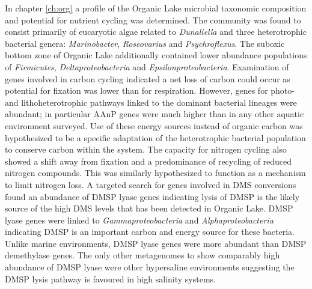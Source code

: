 In chapter \ref{ch:org} a profile of the Organic Lake microbial taxonomic composition and potential for nutrient cycling was determined.
The community was found to consist primarily of eucaryotic algae related to \emph{Dunaliella} and three heterotrophic bacterial genera: \emph{Marinobacter}, \emph{Roseovarius} and \emph{Psychroflexus}.
The suboxic bottom zone of Organic Lake additionally contained lower abundance populations of \emph{Firmicutes}, \emph{Deltaproteobacteria} and \emph{Epsilonproteobacteria}.
Examination of genes involved in carbon cycling indicated a net loss of carbon could occur as potential for fixation was lower than for respiration.
However, genes for photo- and lithoheterotrophic pathways linked to the dominant bacterial lineages were abundant; in particular \ac{AAnP} genes were much higher than in any other aquatic environment surveyed.
Use of these energy sources instead of organic carbon was hypothesized to be a specific adaptation of the heterotrophic bacterial population to conserve carbon within the system.
The capacity for nitrogen cycling also showed a shift away from fixation and a predominance of recycling of reduced nitrogen compounds.
This was similarly hypothesized to function as a mechanism to limit nitrogen loss.
A targeted search for genes involved in \ac{DMS} conversions found an abundance of \ac{DMSP} lyase genes indicating lysis of \ac{DMSP} is the likely source of the high \ac{DMS} levels that has been detected in Organic Lake.
\ac{DMSP} lyase genes were linked to \emph{Gammaproteobacteria} and \emph{Alphaproteobacteria} indicating \ac{DMSP} is an important carbon and energy source for these bacteria.
Unlike marine environments, \ac{DMSP} lyase genes were more abundant than \ac{DMSP} demethylase genes. 
The only other metagenomes to show comparably high abundance of \ac{DMSP} lyase were other hypersaline environments suggesting the DMSP lysis pathway is favoured in high salinity systems. 

